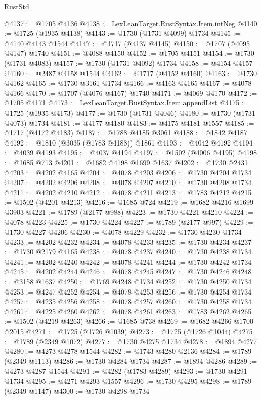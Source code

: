 \begin{lexlean}{RustStd}
\begin{coremodule}
@4137 := @1705 @4136
@4138 := LexLeanTarget.RustSyntax.Item.intNeg
@4140 := @1725 (@1935 @4138)
@4143 := @1730 (@1731 @4099) @1734
@4145 := @4140 @4143 @1544
@4147 := @1717 (@4137 @4145)
@4150 := @1707 (@4095 @4147) @1740
@4151 := @4088 @4150
@4152 := @1705 @4151
@4154 := @1730 (@1731 @4083)
@4157 := @1730 (@1731 @4092) @1734
@4158 := @4154 @4157
@4160 := @2487 @4158 @1544
@4162 := @1717 (@4152 @4160)
@4163 := @1730 @4162
@4165 := @1730 @3161 @1734
@4166 := @4163 @4165
@4167 := @4078 @4166
@4170 := @1707 (@4076 @4167) @1740
@4171 := @4069 @4170
@4172 := @1705 @4171
@4173 := LexLeanTarget.RustSyntax.Item.appendList
@4175 := @1725 (@1935 @4173)
@4177 := @1730 (@1731 @4046)
@4180 := @1730 (@1731 @4073) @1734
@4181 := @4177 @4180
@4183 := @4175 @4181 @1557
@4185 := @1717 (@4172 @4183)
@4187 := @1788 @4185 @3061
@4188 := @1842 @4187
@4192 := @1810 (@3035 (@1783 @4188)) @1861
@4193 := @4042 @4192
@4194 := @4039 @4193
@4195 := @4037 @4194
@4197 := @1502 (@4006 @4195)
@4198 := @1685 @713
@4201 := @1682 @4198 @1699 @1637
@4202 := @1730 @2431
@4203 := @4202 @4165
@4204 := @4078 @4203
@4206 := @1730 @4204 @1734
@4207 := @4202 @4206
@4208 := @4078 @4207
@4210 := @1730 @4208 @1734
@4211 := @4202 @4210
@4212 := @4078 @4211
@4213 := @1783 @4212
@4215 := @1502 (@4201 @4213)
@4216 := @1685 @724
@4219 := @1682 @4216 @1699 @3903
@4221 := @1789 (@2177 @988)
@4223 := @1730 @4221 @4210
@4224 := @4078 @4223
@4225 := @1730 @4224
@4227 := @1789 (@2177 @997)
@4229 := @1730 @4227 @4206
@4230 := @4078 @4229
@4232 := @1730 @4230 @1734
@4233 := @4202 @4232
@4234 := @4078 @4233
@4235 := @1730 @4234
@4237 := @1730 @2179 @4165
@4238 := @4078 @4237
@4240 := @1730 @4238 @1734
@4241 := @4202 @4240
@4242 := @4078 @4241
@4244 := @1730 @4242 @1734
@4245 := @4202 @4244
@4246 := @4078 @4245
@4247 := @1730 @4246
@4248 := @3158 @1637
@4250 := @1769 @4248 @1734
@4252 := @1730 @4250 @1734
@4253 := @4247 @4252
@4254 := @4078 @4253
@4256 := @1730 @4254 @1734
@4257 := @4235 @4256
@4258 := @4078 @4257
@4260 := @1730 @4258 @1734
@4261 := @4225 @4260
@4262 := @4078 @4261
@4263 := @1783 @4262
@4265 := @1502 (@4219 @4263)
@4266 := @1685 @738
@4269 := @1682 @4266 @1700 @2015
@4271 := @1725 (@1726 @1039)
@4273 := @1725 (@1726 @1044)
@4275 := @1789 (@2349 @1072)
@4277 := @1730 @4275 @1734
@4278 := @1894 @4277
@4280 := @4273 @4278 @1544
@4282 := @1743 @4280 @2136
@4284 := @1789 (@2349 @1113)
@4286 := @1730 @4284 @1734
@4287 := @1894 @4286
@4289 := @4273 @4287 @1544
@4291 := @4282 (@1783 @4289)
@4293 := @1730 @4291 @1734
@4295 := @4271 @4293 @1557
@4296 := @1730 @4295
@4298 := @1789 (@2349 @1147)
@4300 := @1730 @4298 @1734

\end{coremodule}
\end{lexlean}
